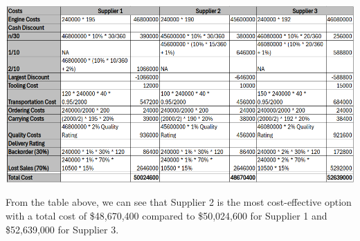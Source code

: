 \documentclass[addpoints]{exam}
\begin{document}
\begin{sloppypar}
\begin{questions}
\begin{solution}






        \begin{center}
            \includegraphics[width=\textwidth]{tca_2.png}
        \end{center}

        From the table above, we can see that Supplier 2 is the most cost-effective option with a total cost of \$48,670,400 compared to \$50,024,600 for Supplier 1 and \$52,639,000 for Supplier 3.

    \end{solution}
\end{questions}

\end{sloppypar}
\end{document}
